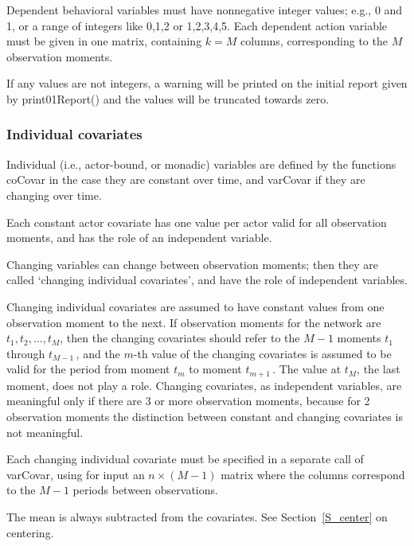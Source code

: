 \documentclass[a4paper,fleqn,11pt]{article}
\newcommand{\+}{\, + \,}
\newcommand{\sfn}[1]{\textsf{#1}}
\begin{document}
Dependent behavioral variables must have nonnegative integer values;
e.g., 0 and 1, or a range of integers like 0,1,2 or 1,2,3,4,5.
Each dependent action variable must be given in one
matrix, containing $k = M$ columns, corresponding to the $M$
observation moments.

If any values are not integers, a warning will be printed on the initial report
given by \sfn{print01Report()} and the values will be truncated towards zero.

\subsubsection{Individual covariates}

Individual (i.e., actor-bound, or monadic) variables
are defined by the functions
\sfn{coCovar} in the case they are constant over time,
and \sfn{varCovar} if they are changing over time.

Each constant actor covariate has one value per actor
valid for all observation moments, and has the role of an
independent variable.

Changing variables can change between observation moments;
then they are called `changing individual covariates',
and have the role of independent variables.

Changing individual covariates are assumed to have constant values from one
observation moment to the next. If observation moments for the
network are $t_1, t_2, ..., t_M$, then the changing covariates
should refer to the $M-1$ moments $t_1$ through $t_{M-1}\,$, and
the $m$-th value of the changing covariates is assumed to be valid
for the period from moment $t_m$ to moment $t_{m+1}\,$.
The value at $t_M$, the last moment, does not play a role.
Changing covariates, as independent variables, are meaningful
only if there are 3 or more observation moments,
because for 2 observation moments the distinction between
constant and changing covariates is not meaningful.

Each changing individual covariate must be specified
in a separate call of \sfn{varCovar}, using for input
an $n \times (M-1)$ matrix where the columns correspond to the $M-1$ periods
between observations.

The mean is always subtracted from the covariates.
See Section~\ref{S_center} on centering.
\end{document}
